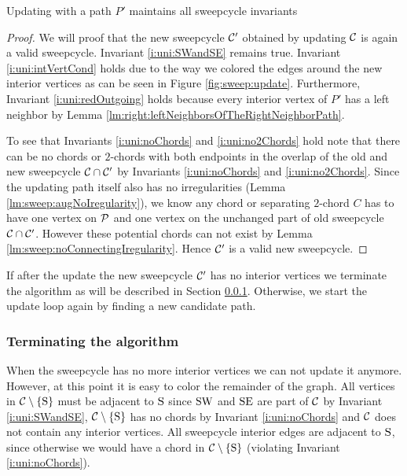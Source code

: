   \begin{lemma}
    \label{lm:sweep:updateMaintainsInvariants}
    Updating with a path $P'$ maintains all sweepcycle invariants
  \end{lemma}
  \begin{proof}
    We will proof that the new sweepcycle $\C'$ obtained by updating $\C$ is again a valid sweepcycle. Invariant \ref{i:uni:SWandSE} remains true. Invariant \ref{i:uni:intVertCond} holds due to the way we colored the edges around the new interior vertices as can be seen in Figure \ref{fig:sweep:update}.
    Furthermore, Invariant \ref{i:uni:redOutgoing} holds because every interior vertex of $P'$ has a left neighbor by Lemma \ref{lm:right:leftNeighborsOfTheRightNeighborPath}.

    To see that Invariants \ref{i:uni:noChords} and \ref{i:uni:no2Chords} hold note that there can be no chords or $2$-chords with both endpoints in the overlap of the old and new sweepcycle $\C \cap \C'$ by Invariants \ref{i:uni:noChords} and \ref{i:uni:no2Chords}.
     Since the updating path itself also has no irregularities (Lemma \ref{lm:sweep:augNoIregularity}),
    we know any chord or separating $2$-chord $C$ has to have one vertex on $\P$ and one vertex on the unchanged part of old sweepcycle $\C \cap \C'$.
    However these potential chords can not exist by Lemma \ref{lm:sweep:noConnectingIregularity}.
    Hence $\C'$ is a valid new sweepcycle.
  \end{proof}

  If after the update the new sweepcycle $\C'$ has no interior vertices we terminate the algorithm as will be described in Section \ref{sss:terminating}.
  Otherwise, we start the update loop again by finding a new candidate path.

\subsubsection{Terminating the algorithm}
  \label{sss:terminating}
  When the sweepcycle has no more interior vertices we can not update it anymore.
  However, at this point it is easy to color the remainder of the graph.
  All vertices in $\cpath$ must be adjacent to $\pS$ since $\pS \pW$ and $\pS \pE$ are part of $\C$ by Invariant \ref{i:uni:SWandSE}, $\cpath$ has no chords by Invariant \ref{i:uni:noChords} and $\C$ does not contain any interior vertices.
  All sweepcycle interior edges are adjacent to $\pS$, since otherwise we would have a chord in $\cpath$ (violating Invariant \ref{i:uni:noChords}).

